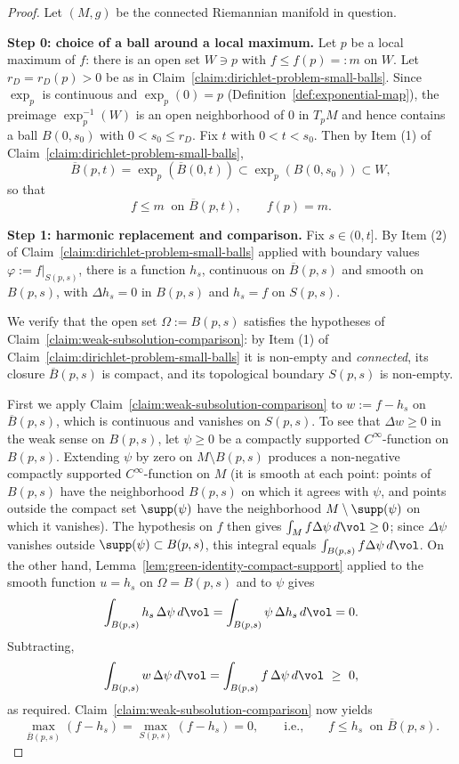 \begin{proof}
Let $(M,g)$ be the connected Riemannian manifold in question.

{\bf Step 0: choice of a ball around a local maximum.} Let $p$ be a
local maximum of $f$: there is an open set $W\ni p$ with $f\le
f(p)=:m$ on $W$. Let $r_D=r_D(p)>0$ be as in
Claim~\ref{claim:dirichlet-problem-small-balls}. Since $\exp_p$ is
continuous and $\exp_p(0)=p$
(Definition~\ref{def:exponential-map}), the preimage
$\exp_p^{-1}(W)$ is an open neighborhood of $0$ in $T_pM$ and hence
contains a ball $B(0,s_0)$ with $0<s_0\le r_D$. Fix $t$ with
$0<t<s_0$. Then by Item (1) of
Claim~\ref{claim:dirichlet-problem-small-balls},
$$\overline{B}(p,t)=\exp_p\left(\overline{B}(0,t)\right)\subset
\exp_p\left(B(0,s_0)\right)\subset W,$$
so that
\begin{equation}
f\le m\ \text{ on }\overline{B}(p,t),\qquad f(p)=m.
\label{eqnlocmax}
\end{equation}

{\bf Step 1: harmonic replacement and comparison.} Fix $s\in(0,t]$.
By Item (2) of Claim~\ref{claim:dirichlet-problem-small-balls}
applied with boundary values $\varphi:=f|_{S(p,s)}$, there is a
function $h_s$, continuous on $\overline{B}(p,s)$ and smooth on
$B(p,s)$, with $\Delta h_s=0$ in $B(p,s)$ and $h_s=f$ on $S(p,s)$.

We verify that the open set $\Omega:=B(p,s)$ satisfies the
hypotheses of Claim~\ref{claim:weak-subsolution-comparison}: by
Item (1) of Claim~\ref{claim:dirichlet-problem-small-balls} it is
non-empty and {\it connected}, its closure $\overline{B}(p,s)$ is
compact, and its topological boundary $S(p,s)$ is non-empty.

First we apply Claim~\ref{claim:weak-subsolution-comparison} to
$w:=f-h_s$ on $\overline{B}(p,s)$, which is continuous and
vanishes on $S(p,s)$. To see that $\Delta w\ge0$ in the weak sense
on $B(p,s)$, let $\psi\ge0$ be a compactly supported
$C^\infty$-function on $B(p,s)$. Extending $\psi$ by zero on
$M\setminus B(p,s)$ produces a non-negative compactly supported
$C^\infty$-function on $M$ (it is smooth at each point: points of
$B(p,s)$ have the neighborhood $B(p,s)$ on which it agrees with
$\psi$, and points outside the compact set $\supp(\psi)$ have
the neighborhood $M\setminus\supp(\psi)$ on which it
vanishes). The hypothesis on $f$ then gives $\int_Mf\Delta\psi\,
d\vol\ge0$; since $\Delta\psi$ vanishes outside $\supp
(\psi)\subset B(p,s)$, this integral equals $\int_{B(p,s)}f\Delta
\psi\,d\vol$. On the other hand,
Lemma~\ref{lem:green-identity-compact-support} applied to the
smooth function $u=h_s$ on $\Omega=B(p,s)$ and to $\psi$ gives
$$\int_{B(p,s)}h_s\,\Delta\psi\,d\vol=\int_{B(p,s)}\psi\,\Delta
h_s\,d\vol=0.$$
Subtracting,
$$\int_{B(p,s)}w\,\Delta\psi\,d\vol=\int_{B(p,s)}f\,\Delta\psi\,
d\vol\ \ge\ 0,$$
as required. Claim~\ref{claim:weak-subsolution-comparison} now
yields
$$\max_{\overline{B}(p,s)}\left(f-h_s\right)
=\max_{S(p,s)}\left(f-h_s\right)=0,\qquad\text{i.e.,}\qquad f\le
h_s\ \text{ on }\overline{B}(p,s).$$


\end{proof}
